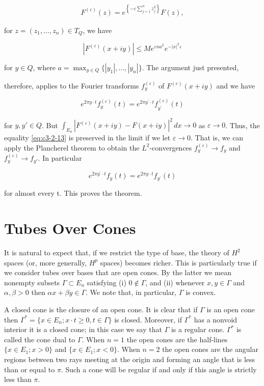 \[
\begin{array}{r}{F^{(\varepsilon)}(z)=e^{\left\{-\varepsilon\displaystyle\sum_{j=1}^{n}z_{j}^{2}\right\}}F(z),}\end{array}
\]

for $z = (z_1, \ldots, z_n) \in T_Q$, we have

\[
|F^{(\varepsilon)}(x+i y)|\leq M e^{\varepsilon n a^{2}}e^{-|x|^{2}\varepsilon}
\]

for $y \in Q$, where $a = \max_{y \in Q} \{|y_1|, \ldots, |y_n|\}$. The argument just presented,

therefore, applies to the Fourier transforms $f_{y}^{(\varepsilon)}$ of $F^{(\varepsilon)}(x + iy)$ and we have

\begin{equation}\label{eq:c3-2-13}
e^{2\pi y\cdot t}f_{y}^{(\varepsilon)}(t)=e^{2\pi y^{\prime}\cdot t}f_{y^{\prime}}^{(\varepsilon)}(t)
\end{equation}

for $y, y' \in Q$. But $\int_{E_n} |F^{(\varepsilon)}(x + iy) - F(x + iy)|^2 \, dx \to 0$ as $\varepsilon \to 0$. Thus, the equality \eqref{eq:c3-2-13} is preserved in the limit if we let $\varepsilon \to 0$. That is, we can apply the Plancherel theorem to obtain the $L^2$-convergences $f_y^{(\varepsilon)} \to f_y$ and $f_y^{(\varepsilon)} \to f_{y'}$. In particular

\[
e^{2\pi y^{\prime}\cdot t}f_{y}(t)=e^{2\pi y\cdot t}f_{y^{\prime}}(t)
\]

for almost every t. This proves the theorem.

\section{Tubes Over Cones}

It is natural to expect that, if we restrict the type of base, the theory of $H^2$ spaces (or, more generally, $H^p$ spaces) becomes richer. This is particularly true if we consider tubes over bases that are open cones. By the latter we mean nonempty subsets $\Gamma \subset E_n$ satisfying (i) $0 \notin \Gamma$, and (ii) whenever $x, y \in \Gamma$ and $\alpha, \beta > 0$ then $\alpha x + \beta y \in \Gamma$. We note that, in particular, $\Gamma$ is convex.

A closed cone is the closure of an open cone. It is clear that if $\Gamma$ is an open cone then $\Gamma^* = \{x \in E_n; x \cdot t \geq 0, t \in \Gamma\}$ is closed. Moreover, if $\Gamma^*$ has a nonvoid interior it is a closed cone; in this case we say that $\Gamma$ is a regular cone. $\Gamma^*$ is called the cone dual to $\Gamma$. When $n = 1$ the open cones are the half-lines $\{x \in E_1; x > 0\}$ and $\{x \in E_1; x < 0\}$. When $n = 2$ the open cones are the angular regions between two rays meeting at the origin and forming an angle that is less than or equal to $\pi$. Such a cone will be regular if and only if this angle is strictly less than $\pi$.

